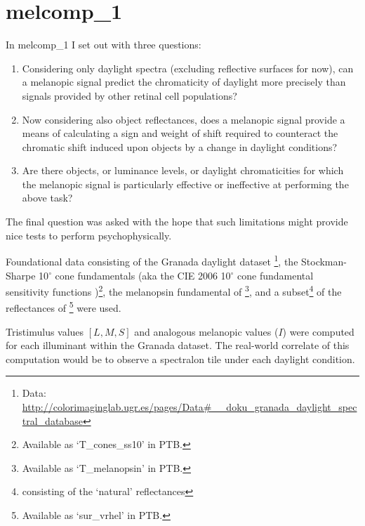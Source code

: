 % 

\section{melcomp\_1}

In melcomp\_1 I set out with three questions:
\begin{enumerate}
\item Considering only daylight spectra (excluding reflective surfaces for now), can a melanopic signal predict the chromaticity of daylight more precisely than signals provided by other retinal cell populations? %
\item Now considering also object reflectances, does a melanopic signal provide a means of calculating a sign and weight of shift required to counteract the chromatic shift induced upon objects by a change in daylight conditions?
\item Are there objects, or luminance levels, or daylight chromaticities for which the melanopic signal is particularly effective or ineffective at performing the above task?
\end{enumerate}

The final question was asked with the hope that such limitations might provide nice tests to perform psychophysically. 

Foundational data consisting of 
the Granada daylight dataset 
\citep{hernandez-andres_color_2001}\footnote{Data: \url{http://colorimaginglab.ugr.es/pages/Data\#__doku_granada_daylight_spectral_database}},
the Stockman-Sharpe 10$^{\circ}$ cone fundamentals 
\citep{stockman_spectral_1999,stockman_spectral_2000}
(aka the CIE 2006 10$^{\circ}$ cone fundamental sensitivity functions \cite{cie_cie_2006})\footnote{Available as `T\_cones\_ss10' in \gls{PTB}.},
the melanopsin fundamental of \citet{lucas_measuring_2014}\footnote{Available as `T\_melanopsin' in \gls{PTB}.},
and a subset\footnote{consisting of the `natural' reflectances} 
of the reflectances of \citet{vrhel_measurement_1994}\footnote{Available as `sur\_vrhel' in \gls{PTB}.}
were used.

Tristimulus values $[L,M,S]$ and analogous melanopic values ($I$) were computed %
for each illuminant within the Granada dataset. The real-world correlate of this computation would be to observe a spectralon tile under each daylight condition.

